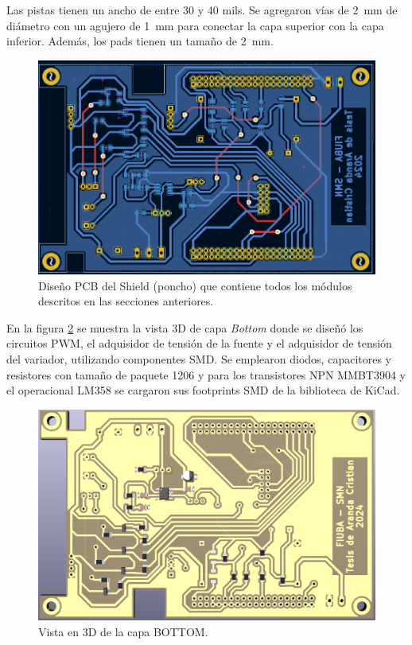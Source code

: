 Las pistas tienen un ancho de entre 30 y 40 mils. Se agregaron vías de \SI{2}{\milli\meter} de diámetro con un agujero de \SI{1}{\milli\meter} para conectar la capa superior con la capa inferior. Además, los pads tienen un tamaño de \SI{2}{\milli\meter}.


\begin{figure}[H]
    \centering
    \includegraphics[width=0.95\linewidth]{Figuras/datalogger/Hardware/pcbDesing.png}
    \caption{Diseño PCB del Shield (poncho) que contiene todos los módulos descritos en las secciones anteriores.}
    \label{fig:pcbDesing}
\end{figure}

En la figura \ref{fig:pcb3dBottom} se muestra la vista 3D de capa \textit{Bottom} donde se diseñó los circuitos PWM, el adquisidor de tensión de la fuente y el adquisidor de tensión del variador, utilizando componentes SMD. Se emplearon diodos, capacitores y resistores con tamaño de paquete 1206 y para los transistores NPN MMBT3904 y el operacional LM358 se cargaron sus footprints SMD de la biblioteca de KiCad.


\begin{figure}[H]
    \centering
    \includegraphics[width=0.95\linewidth]{Figuras/datalogger/Hardware/pcb3dBottom.png}
    \caption{Vista en 3D de la capa BOTTOM.}
    \label{fig:pcb3dBottom}
\end{figure}

